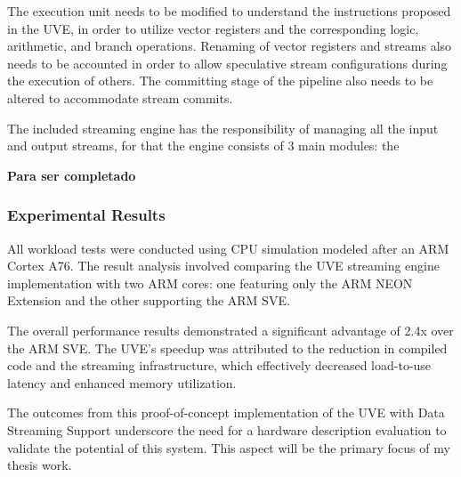 The execution unit needs to be modified to understand the instructions proposed in the UVE, in order to utilize vector registers and the corresponding logic, arithmetic, and branch operations.
Renaming of vector registers and streams also needs to be accounted in order to allow speculative stream configurations during the execution of others. The committing stage of the pipeline also needs to be altered to accommodate stream commits.

The included streaming engine has the responsibility of managing all the input and output streams, for that the engine consists of 3 main modules: the  




\textbf{Para ser completado}


\subsubsection{Experimental Results}

All workload tests were conducted using CPU simulation modeled after an ARM Cortex A76. The result analysis involved comparing the UVE streaming engine implementation with two ARM cores: one featuring only the ARM NEON Extension and the other supporting the ARM SVE.

The overall performance results demonstrated a significant advantage of 2.4x over the ARM SVE. The UVE's speedup was attributed to the reduction in compiled code and the streaming infrastructure, which effectively decreased load-to-use latency and enhanced memory utilization.

The outcomes from this proof-of-concept implementation of the UVE with Data Streaming Support underscore the need for a hardware description evaluation to validate the potential of this system. This aspect will be the primary focus of my thesis work.





